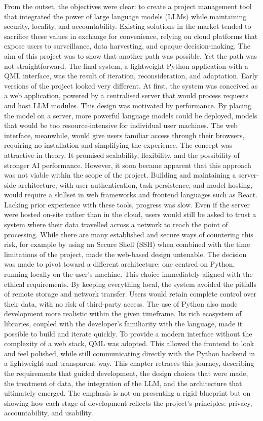 \documentclass{report}
\begin{document}
From the outset, the objectives were clear: to create a project management tool that integrated the power of large language models (LLMs) while maintaining security, locality, and accountability. Existing solutions in the market tended to sacrifice these values in exchange for convenience, relying on cloud platforms that expose users to surveillance, data harvesting, and opaque decision-making. The aim of this project was to show that another path was possible.
Yet the path was not straightforward. The final system, a lightweight Python application with a QML interface, was the result of iteration, reconsideration, and adaptation. Early versions of the project looked very different. At first, the system was conceived as a web application, powered by a centralised server that would process requests and host LLM modules. This design was motivated by performance. By placing the model on a server, more powerful language models could be deployed, models that would be too resource-intensive for individual user machines. The web interface, meanwhile, would give users familiar access through their browsers, requiring no installation and simplifying the experience.
The concept was attractive in theory. It promised scalability, flexibility, and the possibility of stronger AI performance. However, it soon became apparent that this approach was not viable within the scope of the project. Building and maintaining a server-side architecture, with user authentication, task persistence, and model hosting, would require a skillset in web frameworks and frontend languages such as React. Lacking prior experience with these tools, progress was slow. Even if the server were hosted on-site rather than in the cloud, users would still be asked to trust a system where their data travelled across a network to reach the point of processing. While there are many established and secure ways of countering this risk, for example by using an Secure Shell (SSH) when combined with the time limitations of the project, made the web-based design untenable.
The decision was made to pivot toward a different architecture: one centred on Python, running locally on the user's machine. This choice immediately aligned with the ethical requirements. By keeping everything local, the system avoided the pitfalls of remote storage and network transfer. Users would retain complete control over their data, with no risk of third-party access. The use of Python also made development more realistic within the given timeframe. Its rich ecosystem of libraries, coupled with the developer's familiarity with the language, made it possible to build and iterate quickly. To provide a modern interface without the complexity of a web stack, QML was adopted. This allowed the frontend to look and feel polished, while still communicating directly with the Python backend in a lightweight and transparent way.
This chapter retraces this journey, describing the requirements that guided development, the design choices that were made, the treatment of data, the integration of the LLM, and the architecture that ultimately emerged. The emphasis is not on presenting a rigid blueprint but on showing how each stage of development reflects the project's principles: privacy, accountability, and usability.
\end{document}
